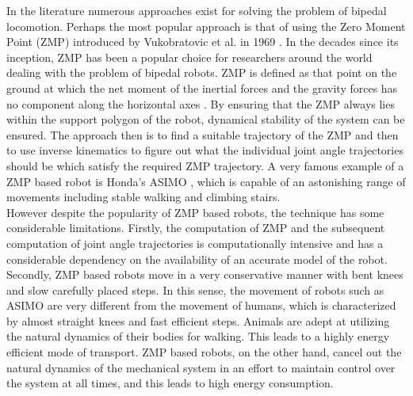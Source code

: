 \documentclass[12pt,twoside]{article}
\theoremstyle{plain}
\theoremstyle{definition}
\theoremstyle{remark}
\newcommand{\forceindent}{\leavevmode{\parindent=2em\indent}}
\begin{document}
\forceindent In the literature numerous approaches exist for solving the problem of bipedal locomotion. Perhaps the most popular approach is that of using the  Zero Moment Point (ZMP) introduced by Vukobratovic et al. in 1969 \cite{vukobratovic1969contribution, jurivcic1972mathematical}. In the decades since its inception, ZMP has been a popular choice for researchers around the world dealing with the problem of bipedal robots. ZMP is defined as that point on the ground at which the net moment of the inertial forces and the gravity forces has no component along the horizontal axes \cite{vukobratovic2004zero}. By ensuring that the ZMP always lies within the support polygon of the robot, dynamical stability of the system can be ensured. The approach then is to find a suitable trajectory of the ZMP and then to use inverse kinematics to figure out what the individual joint angle trajectories should be which satisfy the required ZMP trajectory. A very famous example of a ZMP based robot is Honda's ASIMO \cite{sakagami2002intelligent}, which is capable of an astonishing range of movements including stable walking and climbing stairs.\\
\forceindent However despite the popularity of ZMP based robots, the technique has some considerable limitations. Firstly, the computation of ZMP and the subsequent computation of joint angle trajectories is computationally intensive and has a considerable dependency on the availability of an accurate model of the robot. Secondly, ZMP based robots move in a very conservative manner with bent knees and slow carefully placed steps. In this sense, the movement of robots such as ASIMO are very different from the movement of humans, which is characterized by almost straight knees and fast efficient steps. Animals are adept at utilizing the natural dynamics of their bodies for walking. This leads to a highly energy efficient mode of transport. ZMP based robots, on the other hand, cancel out the natural dynamics of the mechanical system in an effort to maintain control over the system at all times, and this leads to high energy consumption.\\
\end{document}
